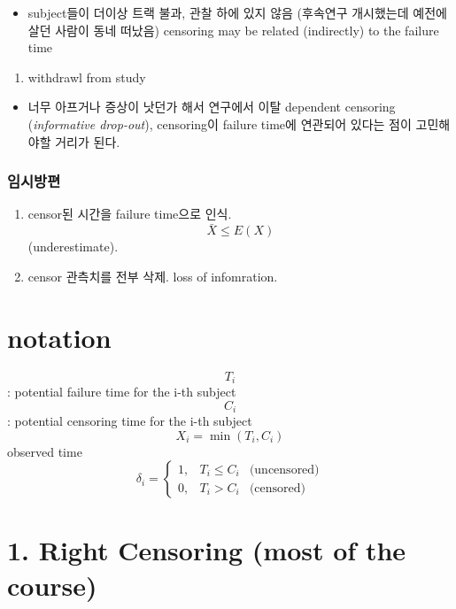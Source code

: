 \documentclass[
]{book}
\providecommand{\tightlist}{%
  \setlength{\itemsep}{0pt}\setlength{\parskip}{0pt}}
\theoremstyle{definition}
\theoremstyle{definition}
\theoremstyle{definition}
\theoremstyle{definition}
\theoremstyle{remark}
\begin{document}
\begin{itemize}
\tightlist
\item
  subject들이 더이상 트랙 불과, 관찰 하에 있지 않음 (후속연구 개시했는데 예전에 살던 사람이 동네 떠났음)
  censoring may be related (indirectly) to the failure time
\end{itemize}

\begin{enumerate}
\def\labelenumi{\arabic{enumi}.}
\setcounter{enumi}{2}
\tightlist
\item
  withdrawl from study
\end{enumerate}

\begin{itemize}
\tightlist
\item
  너무 아프거나 증상이 낫던가 해서 연구에서 이탈
  dependent censoring (\emph{informative drop-out}), censoring이 failure time에 연관되어 있다는 점이 고민해야할 거리가 된다.
\end{itemize}

\hypertarget{uxc784uxc2dcuxbc29uxd3b8}{%
\subsection{임시방편}\label{uxc784uxc2dcuxbc29uxd3b8}}

\begin{enumerate}
\def\labelenumi{\arabic{enumi}.}
\item
  censor된 시간을 failure time으로 인식. \[\bar X \le E(X)\] (underestimate).
\item
  censor 관측치를 전부 삭제. loss of infomration.
\end{enumerate}

\hypertarget{notation}{%
\chapter{notation}\label{notation}}

\[T_i\]: potential failure time for the i-th subject
\[C_i\]: potential censoring time for the i-th subject
\[X_i = \min(T_i , C_i )\] observed time
\[\delta_i = \begin{cases} 1, & T_i \le C_i & \text{(uncensored)} \\ 0, & T_i > C_i & \text{(censored)} \end{cases}\]

\hypertarget{right-censoring-most-of-the-course}{%
\chapter{1. Right Censoring (most of the course)}\label{right-censoring-most-of-the-course}}
\end{document}

